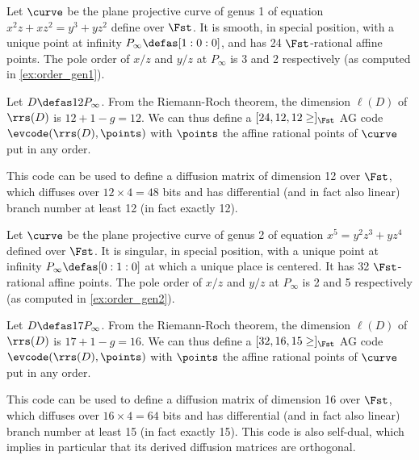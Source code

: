 \begin{example}
\label{ex:genus1}
Let $\curve$ be the plane projective curve of genus 1 of equation $x^2z + xz^2 = y^3 + yz^2$ define over $\Fst$. It is smooth, in special position,
with a unique point at infinity $P_\infty \defas [1:0:0]$, and has 24 $\Fst$-rational affine points. The pole order
of $x/z$ and $y/z$ at $P_\infty$ is 3 and 2 respectively (as computed in \autoref{ex:order_gen1}).

Let $D \defas 12P_\infty$. From the Riemann-Roch theorem, the dimension $\ell(D)$ of $\rrs(D)$ is $12 + 1 - g = 12$. We can thus
define a $[24, 12, 12 \geq]_{\Fst}$ AG code $\evcode(\rrs(D), \points)$ with $\points$ the affine rational points of $\curve$
put in any order.

This code can be used to define a diffusion matrix of dimension 12 over $\Fst$, which diffuses over $12\times 4 = 48$ bits and
has differential (and in fact also linear) branch number at least 12 (in fact exactly 12). 
\end{example}

\begin{example}
\label{ex:genus2}
Let $\curve$ be the plane projective curve of genus 2 of equation $x^5 = y^2z^3 + yz^4$ defined over $\Fst$. It is singular, in special position,
with a unique point at infinity $P_\infty \defas [0:1:0]$ at which a unique place is centered. It has 32 $\Fst$-rational affine points. The pole order
of $x/z$ and $y/z$ at $P_\infty$ is 2 and 5 respectively (as computed in \autoref{ex:order_gen2}).

Let $D \defas 17P_\infty$. From the Riemann-Roch theorem, the dimension $\ell(D)$ of $\rrs(D)$ is $17 + 1 - g = 16$. We can thus
define a $[32, 16, 15 \geq]_{\Fst}$ AG code $\evcode(\rrs(D), \points)$ with $\points$ the affine rational points of $\curve$
put in any order.

This code can be used to define a diffusion matrix of dimension 16 over $\Fst$, which diffuses over $16\times 4 = 64$ bits and
has differential (and in fact also linear) branch number at least 15 (in fact exactly 15). This code is also self-dual,
which implies in particular that its derived diffusion matrices are orthogonal.
\end{example}
